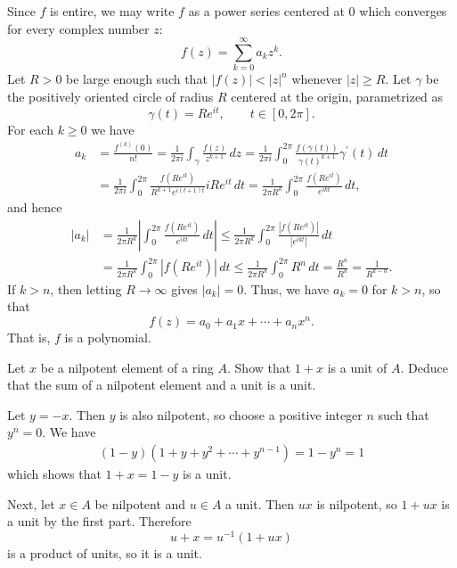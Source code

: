 \documentclass{homework}
\begin{document}
\begin{solution}
Since $f$ is entire, we may write $f$ as a power series centered at $0$ which
converges for every complex number $z$:
\begin{equation*}
f(z) = \sum_{k=0}^\infty a_k z^k.
\end{equation*}
Let $R > 0$ be large enough such that $|f(z)| < |z|^n$ whenever $|z| \geq R$.
Let $\gamma$ be the positively oriented circle of radius $R$ centered at the
origin, parametrized as
\begin{equation*}
\gamma(t) = R e^{i t},
\qquad
t \in [0,2\pi].
\end{equation*}
For each $k \geq 0$ we have
\begin{align*}
a_k
&= \frac{f^{(k)}(0)}{n!}
= \frac{1}{2 \pi i} \int_\gamma \frac{f(z)}{z^{k+1}} \, dz
= \frac{1}{2 \pi i} \int_0^{2\pi} \frac{f(\gamma(t))}{\gamma(t)^{k+1}} \gamma^\prime(t) \, dt
\\&= \frac{1}{2 \pi i} \int_0^{2\pi} \frac{f(R e^{i t})}{R^{k+1} e^{i(t+1) t}} i R e^{i t} \, dt
= \frac{1}{2 \pi R^k} \int_0^{2\pi} \frac{f(R e^{i t})}{e^{i k t}} \, dt,
\end{align*}
and hence
\begin{align*}
|a_k|
&= \frac{1}{2 \pi R^k} \left|\int_0^{2\pi} \frac{f(R e^{i t})}{e^{i k t}} \, dt\right|
\leq \frac{1}{2 \pi R^k} \int_0^{2\pi} \frac{|f(R e^{i t})|}{|e^{i k t}|} \, dt
\\&= \frac{1}{2 \pi R^k} \int_0^{2\pi} |f(R e^{i t})| \, dt
\leq \frac{1}{2 \pi R^k} \int_0^{2\pi} R^n \, dt
= \frac{R^n}{R^k}
= \frac{1}{R^{k - n}}.
\end{align*}
If $k > n$, then letting $R \to \infty$ gives $|a_k| = 0$.
Thus, we have $a_k = 0$ for $k > n$, so that
\begin{equation*}
f(z) = a_0 + a_1 x + \cdots + a_n x^n.
\end{equation*}
That is, $f$ is a polynomial.
\end{solution}

\begin{problem}
Let $x$ be a nilpotent element of a ring $A$.
Show that $1 + x$ is a unit of $A$.
Deduce that the sum of a nilpotent element and a unit is a unit.
\end{problem}

\begin{solution}
Let $y = -x$.
Then $y$ is also nilpotent, so choose a positive integer $n$ such that
$y^n = 0$.
We have
\begin{align*}
(1 - y) (1 + y + y^2 + \cdots + y^{n-1})
= 1 - y^n
= 1
\end{align*}
which shows that $1 + x = 1 - y$ is a unit.

Next, let $x\in A$ be nilpotent and $u\in A$ a unit.
Then $ux$ is nilpotent, so $1 + ux$ is a unit by the first part.
Therefore
\begin{equation*}
u + x = u^{-1}(1 + ux)
\end{equation*}
is a product of units, so it is a unit.
\end{solution}
\end{document}
